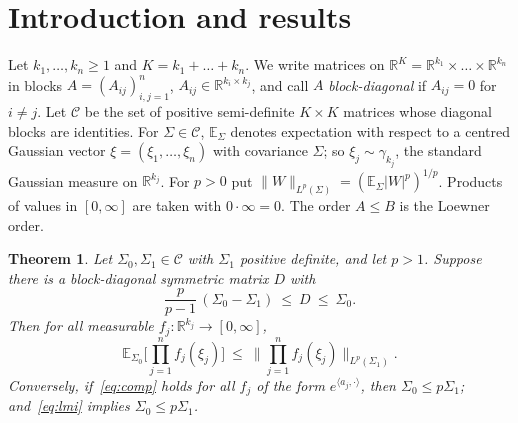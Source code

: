 \documentclass[11pt]{amsart}
\newtheorem{theorem}{Theorem}[section]
\theoremstyle{definition}
\newcommand{\E}{\mathbb{E}}
\newcommand{\R}{\mathbb{R}}
\begin{document}
\section{Introduction and results}
Let $k_1,\dots,k_n\ge1$ and $K=k_1+\dots+k_n$. We write matrices on $\R^K=\R^{k_1}\times\dots\times\R^{k_n}$ in
blocks $A=(A_{ij})_{i,j=1}^n$, $A_{ij}\in\R^{k_i\times k_j}$, and call $A$ \emph{block-diagonal} if $A_{ij}=0$ for
$i\ne j$. Let $\mathcal C$ be the set of positive semi-definite $K\times K$ matrices whose diagonal blocks are
identities. For $\Sigma\in\mathcal C$, $\E_\Sigma$ denotes expectation with respect to a centred Gaussian vector
$\xi=(\xi_1,\dots,\xi_n)$ with covariance $\Sigma$; so $\xi_j\sim\gamma_{k_j}$, the standard Gaussian measure on
$\R^{k_j}$. For $p>0$ put $\|W\|_{L^p(\Sigma)}=(\E_\Sigma|W|^p)^{1/p}$. Products of values in $[0,\infty]$ are taken
with $0\cdot\infty=0$. The order $A\le B$ is the Loewner order.

\begin{theorem}\label{thm:main}
Let $\Sigma_0,\Sigma_1\in\mathcal C$ with $\Sigma_1$ positive definite, and let $p>1$. Suppose there is a
block-diagonal symmetric matrix $D$ with
\begin{equation}\label{eq:lmi}
\frac p{p-1}\,(\Sigma_0-\Sigma_1)\ \le\ D\ \le\ \Sigma_0 .
\end{equation}
Then for all measurable $f_j:\R^{k_j}\to[0,\infty]$,
\begin{equation}\label{eq:comp}
\E_{\Sigma_0}\Big[\prod_{j=1}^nf_j(\xi_j)\Big]\ \le\ \Big\|\prod_{j=1}^nf_j(\xi_j)\Big\|_{L^p(\Sigma_1)} .
\end{equation}
Conversely, if~\eqref{eq:comp} holds for all $f_j$ of the form $e^{\langle a_j,\cdot\rangle}$, then
$\Sigma_0\le p\Sigma_1$; and~\eqref{eq:lmi} implies $\Sigma_0\le p\Sigma_1$.
\end{theorem}
\end{document}
